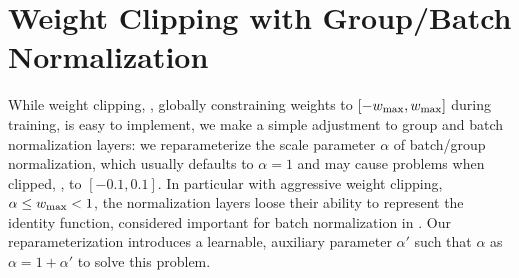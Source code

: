 \section{Weight Clipping with Group/Batch Normalization}
\label{sec:supp-clipping}

While weight clipping, \ie, globally constraining weights to $[-\wmax, \wmax]$ during training, is easy to implement, we make a simple adjustment to group and batch normalization layers: we reparameterize the scale parameter $\alpha$ of batch/group normalization, which usually defaults to $\alpha = 1$ and may cause problems when clipped, \eg, to $[-0.1, 0.1]$. In particular with aggressive weight clipping, $\alpha \leq \wmax < 1$, the normalization layers loose their ability to represent the identity function, considered important for batch normalization in \cite{IoffeICML2015}. Our reparameterization introduces a learnable, auxiliary parameter $\alpha'$ such that $\alpha$ as $\alpha = 1 + \alpha'$ to solve this problem.